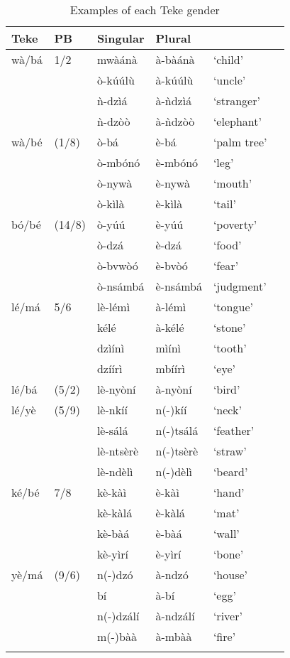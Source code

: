 \documentclass[output=paper,,modfonts,nonflat]{langsci/langscibook-Hyman-et-al}
\begin{document}
\begin{table}[!htbp]
\caption{Examples of each Teke gender}
\label{table5}
\begin{small}	
\begin{tabular}{l		l		l		l		l		l}
  \lsptoprule
Teke	&	PB	&	Singular	&	Plural	&		\\	
\midrule
wà/bá	&	1/2	&	mwàánà	&	à-bàánà	&	`child’	\\	
	&		&	ò-kúúlù	&	à-kúúlù	&	`uncle’	\\	
	&		&	ǹ-dzìá	&	à-ǹdzìá	&	`stranger’	\\	
	&		&	ǹ-dzòò	&	à-ǹdzòò	&	`elephant’	\\	[0.2cm]
wà/bé	&	(1/8)	&	ò-bá	&	è-bá	&	`palm tree’	\\	
	&		&	ò-mbónó	&	è-mbónó	&	`leg’	\\	
	&		&	ò-nywà	&	è-nywà	&	`mouth’	\\	
	&		&	ò-kìlà	&	è-kìlà	&	`tail’	\\	[0.2cm]
bó/bé	&	(14/8)	&	ò-yúú	&	è-yúú	&	`poverty’	\\	
	&		&	ò-dzá	&	è-dzá	&	`food’	\\	
	&		&	ò-bvwòó	&	è-bvòó	&	`fear’	\\	
	&		&	ò-nsámbá	&	è-nsámbá	&	`judgment’	\\	[0.2cm]
lé/má\footnotemark	&	5/6	&	lè-lémì	&	à-lémì	&	`tongue’	\\	
	&		&	kélé	&	à-kélé	&	`stone’	\\	
	&		&	dzìínì	&	mìínì	&	`tooth’	\\
	&		&	dzíírì	&	mbíírì	&	`eye’	\\	[0.2cm]
lé/bá	&	(5/2)	&	lè-nyòní	&	à-nyòní	&	`bird’	\\	[0.2cm]
lé/yè	&	(5/9)	&	lè-nkíí	&	n(-)kíí	&	`neck’	\\	
	&		&	lè-sálá	&	n(-)tsálá	&	`feather’	\\	
	&		&	lè-ntsèrè	&	n(-)tsèrè	&	`straw’	\\	
	&		&	lè-ndèlì	&	n(-)dèlì	&	`beard’	\\	[0.2cm]
ké/bé	&	7/8	&	kè-kàì	&	è-kàì	&	`hand’	\\	
	&		&	kè-kàlá	&	è-kàlá	&	`mat’	\\	
	&		&	kè-bàá	&	è-bàá	&	`wall’	\\	
	&		&	kè-yìrí	&	è-yìrí	&	`bone’	\\	[0.2cm]
yè/má	&	(9/6)	&	n(-)dzó	&	à-ndzó	&	`house’	\\	
	&		&	bí	&	à-bí	&	`egg’	\\	
	&		&	n(-)dzálí	&	à-ndzálí	&	`river’	\\	
	&		&	m(-)bàà	&	à-mbàà	&	`fire’	\\	
  \lspbottomrule
\end{tabular}
\end{small}	
\end{table}
\end{document}
